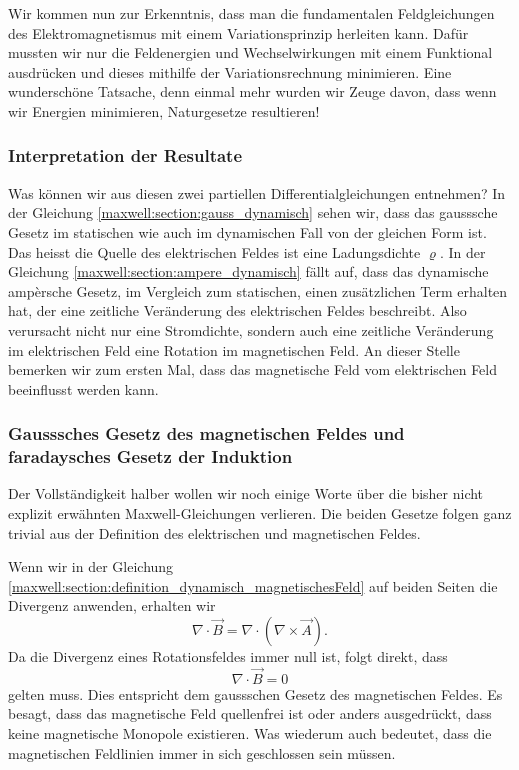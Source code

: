 Wir kommen nun zur Erkenntnis, dass man die fundamentalen Feldgleichungen des Elektromagnetismus mit einem Variationsprinzip herleiten kann.
Dafür mussten wir nur die Feldenergien und Wechselwirkungen mit einem Funktional ausdrücken und dieses mithilfe der Variationsrechnung minimieren.
Eine wunderschöne Tatsache, denn einmal mehr wurden wir Zeuge davon, dass wenn wir Energien minimieren, Naturgesetze resultieren!

\subsubsection{Interpretation der Resultate}
Was können wir aus diesen zwei partiellen Differentialgleichungen entnehmen?
In der Gleichung \eqref{maxwell:section:gauss_dynamisch} sehen wir, dass das gausssche Gesetz im statischen wie auch im dynamischen Fall von der gleichen Form ist.
Das heisst die Quelle des elektrischen Feldes ist eine Ladungsdichte $\varrho$.
In der Gleichung \eqref{maxwell:section:ampere_dynamisch} fällt auf, dass das dynamische ampèrsche Gesetz, im Vergleich zum statischen, einen zusätzlichen Term erhalten hat, der eine zeitliche Veränderung des elektrischen Feldes beschreibt.
Also verursacht nicht nur eine Stromdichte, sondern auch eine zeitliche Veränderung im elektrischen Feld eine Rotation im magnetischen Feld.
An dieser Stelle bemerken wir zum ersten Mal, dass das magnetische Feld vom elektrischen Feld beeinflusst werden kann.


\subsubsection{Gausssches Gesetz des magnetischen Feldes und faradaysches Gesetz der Induktion}
Der Vollständigkeit halber wollen wir noch einige Worte über die bisher nicht explizit erwähnten Maxwell-Gleichungen verlieren.
Die beiden Gesetze folgen ganz trivial aus der Definition des elektrischen und magnetischen Feldes.
 
Wenn wir in der Gleichung \eqref{maxwell:section:definition_dynamisch_magnetischesFeld} auf beiden Seiten die Divergenz anwenden, erhalten wir
\[
\nabla \cdot \vec{B}
=
\nabla \cdot (\nabla \times \vec{A}).
\]
Da die Divergenz eines Rotationsfeldes immer null ist, folgt direkt, dass
\begin{equation}
\nabla \cdot \vec{B}
=
0
\label{maxwell:section:Gauss_magnetisches_Feld}
\end{equation}
gelten muss.
Dies entspricht dem gaussschen Gesetz des magnetischen Feldes.
Es besagt, dass das magnetische Feld quellenfrei ist oder anders ausgedrückt, dass keine magnetische Monopole existieren. Was wiederum auch bedeutet, dass die magnetischen Feldlinien immer in sich geschlossen sein müssen.
 
